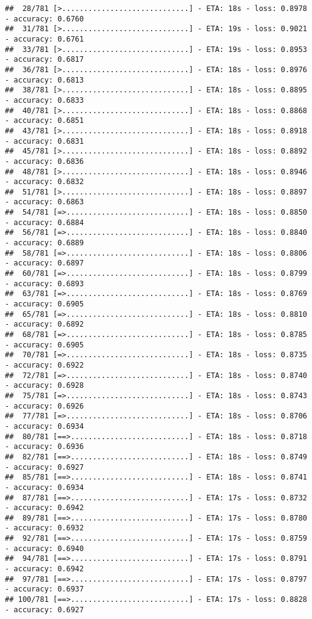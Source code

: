 \documentclass[
]{article}
\begin{document}
\begin{verbatim}
##  28/781 [>.............................] - ETA: 18s - loss: 0.8978 - accuracy: 0.6760
##  31/781 [>.............................] - ETA: 19s - loss: 0.9021 - accuracy: 0.6761
##  33/781 [>.............................] - ETA: 19s - loss: 0.8953 - accuracy: 0.6817
##  36/781 [>.............................] - ETA: 18s - loss: 0.8976 - accuracy: 0.6813
##  38/781 [>.............................] - ETA: 18s - loss: 0.8895 - accuracy: 0.6833
##  40/781 [>.............................] - ETA: 18s - loss: 0.8868 - accuracy: 0.6851
##  43/781 [>.............................] - ETA: 18s - loss: 0.8918 - accuracy: 0.6831
##  45/781 [>.............................] - ETA: 18s - loss: 0.8892 - accuracy: 0.6836
##  48/781 [>.............................] - ETA: 18s - loss: 0.8946 - accuracy: 0.6832
##  51/781 [>.............................] - ETA: 18s - loss: 0.8897 - accuracy: 0.6863
##  54/781 [=>............................] - ETA: 18s - loss: 0.8850 - accuracy: 0.6884
##  56/781 [=>............................] - ETA: 18s - loss: 0.8840 - accuracy: 0.6889
##  58/781 [=>............................] - ETA: 18s - loss: 0.8806 - accuracy: 0.6897
##  60/781 [=>............................] - ETA: 18s - loss: 0.8799 - accuracy: 0.6893
##  63/781 [=>............................] - ETA: 18s - loss: 0.8769 - accuracy: 0.6905
##  65/781 [=>............................] - ETA: 18s - loss: 0.8810 - accuracy: 0.6892
##  68/781 [=>............................] - ETA: 18s - loss: 0.8785 - accuracy: 0.6905
##  70/781 [=>............................] - ETA: 18s - loss: 0.8735 - accuracy: 0.6922
##  72/781 [=>............................] - ETA: 18s - loss: 0.8740 - accuracy: 0.6928
##  75/781 [=>............................] - ETA: 18s - loss: 0.8743 - accuracy: 0.6926
##  77/781 [=>............................] - ETA: 18s - loss: 0.8706 - accuracy: 0.6934
##  80/781 [==>...........................] - ETA: 18s - loss: 0.8718 - accuracy: 0.6936
##  82/781 [==>...........................] - ETA: 18s - loss: 0.8749 - accuracy: 0.6927
##  85/781 [==>...........................] - ETA: 18s - loss: 0.8741 - accuracy: 0.6934
##  87/781 [==>...........................] - ETA: 17s - loss: 0.8732 - accuracy: 0.6942
##  89/781 [==>...........................] - ETA: 17s - loss: 0.8780 - accuracy: 0.6932
##  92/781 [==>...........................] - ETA: 17s - loss: 0.8759 - accuracy: 0.6940
##  94/781 [==>...........................] - ETA: 17s - loss: 0.8791 - accuracy: 0.6942
##  97/781 [==>...........................] - ETA: 17s - loss: 0.8797 - accuracy: 0.6937
## 100/781 [==>...........................] - ETA: 17s - loss: 0.8828 - accuracy: 0.6927

\end{verbatim}
\end{document}
